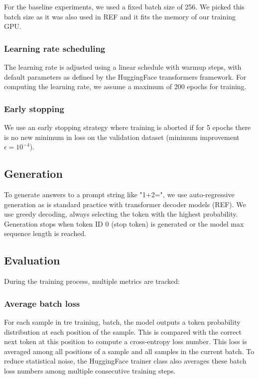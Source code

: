 For the baseline experiments, we used a fixed batch size of 256. We picked this batch size as it was also used in REF and it fits the memory of our training GPU.

\subsubsection{Learning rate scheduling}

The learning rate is adjusted using a linear schedule with warmup steps, with default parameters as defined by the HuggingFace transformers framework.
For computing the learning rate, we assume a maximum of 200 epochs for training.

\subsubsection{Early stopping}
\label{early_stopping}

We use an early stopping strategy where training is aborted if for 5 epochs there is no new minimum in loss on the validation dataset (minimum improvement $\epsilon=10^{-4}$).

\subsection{Generation}

To generate answers to a prompt string like "1+2=", we use auto-regressive generation as is standard practice with transformer decoder models (REF). We use greedy decoding, always selecting the token with the highest probability. Generation stops when token ID 0 (stop token) is generated or the model max sequence length is reached.
\label{model_generation}

\subsection{Evaluation}

During the training process, multiple metrics are tracked:

\subsubsection{Average batch loss}
For each sample in tre training, batch, the model outputs a token probability distribution at each position of the sample. This is compared with the correct next token at this position to compute a cross-entropy loss number. This loss is averaged among all positions of a sample and all samples in the current batch. To reduce statistical noise, the HuggingFace trainer class also averages these batch loss numbers among multiple consecutive training steps.

